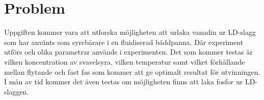 \section{Problem}


     









Uppgiften kommer vara att utforska möjligheten att urlaka vanadin ur LD-slagg som har använts som syrebärare i en fluidiserad bäddpanna. Där experiment utförs och olika parametrar används i experimenten. Det som kommer testas är vilken koncentration av svavelsyra, vilken temperatur samt vilket förhållande mellan flytande och fast fas som kommer att ge optimalt resultat för utvinningen. I mån av tid kommer det även testas om möjligheten finns att laka fosfor ur LD-slaggen.
